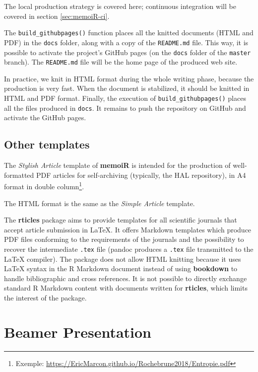 \documentclass[
  12pt,
  american,
  a4paper,
  extrafontsizes,onecolumn,openright
  ]{memoir}
\begin{document}
The local production strategy is covered here; continuous integration will be covered in section \ref{sec:memoiR-ci}.

The \texttt{build\_githubpages()} function places all the knitted documents (HTML and PDF) in the \texttt{docs} folder, along with a copy of the \texttt{README.md} file.
This way, it is possible to activate the project's GitHub pages (on the \texttt{docs} folder of the \texttt{master} branch).
The \texttt{README.md} file will be the home page of the produced web site.

In practice, we knit in HTML format during the whole writing phase, because the production is very fast.
When the document is stabilized, it should be knitted in HTML and PDF format.
Finally, the execution of \texttt{build\_githubpages()} places all the files produced in \texttt{docs}.
It remains to push the repository on GitHub and activate the GitHub pages.

\subsection{Other templates}\label{other-templates}

The \emph{Stylish Article} template of \textbf{memoiR} is intended for the production of well-formatted PDF articles for self-archiving (typically, the HAL repository), in A4 format in double column\footnote{Exemple: \url{https://EricMarcon.github.io/Rochebrune2018/Entropie.pdf}}.

The HTML format is the same as the \emph{Simple Article} template.

The \textbf{rticles} package aims to provide templates for all scientific journals that accept article submission in LaTeX.
It offers Markdown templates which produce PDF files conforming to the requirements of the journals and the possibility to recover the intermediate \texttt{.tex} file (pandoc produces a \texttt{.tex} file transmitted to the LaTeX compiler).
The package does not allow HTML knitting because it uses LaTeX syntax in the R Markdown document instead of using \textbf{bookdown} to handle bibliographic and cross references.
It is not possible to directly exchange standard R Markdown content with documents written for \textbf{rticles}, which limits the interest of the package.

\section{Beamer Presentation}\label{beamer-presentation}
\end{document}
